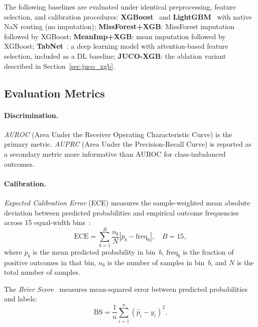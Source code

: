 \documentclass[a4paper,fleqn,longmktitle]{cas-sc}
\begin{document}
	The following baselines are evaluated under identical preprocessing,
	feature selection, and calibration procedures:
	\textbf{XGBoost}~\citep{chen2016xgboost} and
	\textbf{LightGBM}~\citep{ke2017lightgbm}
	with native NaN routing (no imputation);
	\textbf{MissForest+XGB}: MissForest imputation~\citep{stekhoven2012missforest}
	followed by XGBoost;
	\textbf{MeanImp+XGB}: mean imputation followed by XGBoost;
	\textbf{TabNet}~\citep{arik2021tabnet}: a deep learning model
	with attention-based feature selection, included as a DL baseline;
	\textbf{JUCO-XGB}: the ablation variant described in Section~\ref{sec:juco_xgb}.
	
	\subsection{Evaluation Metrics}
	\label{sec:metrics}
	
	\paragraph{Discrimination.}
	\emph{AUROC} (Area Under the Receiver Operating Characteristic
	Curve) is the primary metric.
	\emph{AUPRC} (Area Under the Precision-Recall Curve) is reported
	as a secondary metric more informative than AUROC for class-imbalanced
	outcomes.
	
	\paragraph{Calibration.}
	\emph{Expected Calibration Error} (ECE) measures the
	sample-weighted mean absolute deviation between predicted
	probabilities and empirical outcome frequencies across 15
	equal-width bins~\citep{naeini2015obtaining}:
	\begin{equation}
		\text{ECE} = \sum_{b=1}^{B} \frac{n_b}{N}
			\left|\overline{p}_b - \text{freq}_b\right|, \quad B = 15,
		\label{eq:ece}
	\end{equation}
	where $\overline{p}_b$ is the mean predicted probability in bin~$b$,
	$\text{freq}_b$ is the fraction of positive outcomes in that bin,
	$n_b$ is the number of samples in bin~$b$, and $N$ is the total
	number of samples.
	
	The \emph{Brier Score}~\citep{brier1950verification} measures
	mean-squared error between predicted probabilities and labels:
	\begin{equation}
		\text{BS} = \frac{1}{n}\sum_{i=1}^{n}(\hat{p}_i - y_i)^2.
		\label{eq:brier}
	\end{equation}
	
\end{document}
